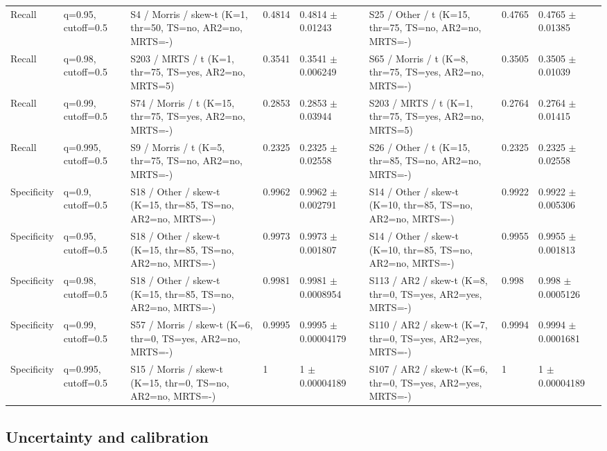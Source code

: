 \documentclass[11pt]{article}
\begin{document}
\begin{landscape}
\begin{longtable}{@{}P{1.6cm}P{1.8cm}P{5.2cm}P{1.3cm}P{2.1cm}P{5.2cm}P{1.3cm}P{2.1cm}@{}}
Recall & q=0.95, cutoff=0.5 & S4 / Morris / skew-t (K=1, thr=50, TS=no, AR2=no, MRTS=-) & 0.4814 & 0.4814 $\pm$ 0.01243 & S25 / Other / t (K=15, thr=75, TS=no, AR2=no, MRTS=-) & 0.4765 & 0.4765 $\pm$ 0.01385 \\
Recall & q=0.98, cutoff=0.5 & S203 / MRTS / t (K=1, thr=75, TS=yes, AR2=no, MRTS=5) & 0.3541 & 0.3541 $\pm$ 0.006249 & S65 / Morris / t (K=8, thr=75, TS=yes, AR2=no, MRTS=-) & 0.3505 & 0.3505 $\pm$ 0.01039 \\
Recall & q=0.99, cutoff=0.5 & S74 / Morris / t (K=15, thr=75, TS=yes, AR2=no, MRTS=-) & 0.2853 & 0.2853 $\pm$ 0.03944 & S203 / MRTS / t (K=1, thr=75, TS=yes, AR2=no, MRTS=5) & 0.2764 & 0.2764 $\pm$ 0.01415 \\
Recall & q=0.995, cutoff=0.5 & S9 / Morris / t (K=5, thr=75, TS=no, AR2=no, MRTS=-) & 0.2325 & 0.2325 $\pm$ 0.02558 & S26 / Other / t (K=15, thr=85, TS=no, AR2=no, MRTS=-) & 0.2325 & 0.2325 $\pm$ 0.02558 \\
Specificity & q=0.9, cutoff=0.5 & S18 / Other / skew-t (K=15, thr=85, TS=no, AR2=no, MRTS=-) & 0.9962 & 0.9962 $\pm$ 0.002791 & S14 / Other / skew-t (K=10, thr=85, TS=no, AR2=no, MRTS=-) & 0.9922 & 0.9922 $\pm$ 0.005306 \\
Specificity & q=0.95, cutoff=0.5 & S18 / Other / skew-t (K=15, thr=85, TS=no, AR2=no, MRTS=-) & 0.9973 & 0.9973 $\pm$ 0.001807 & S14 / Other / skew-t (K=10, thr=85, TS=no, AR2=no, MRTS=-) & 0.9955 & 0.9955 $\pm$ 0.001813 \\
Specificity & q=0.98, cutoff=0.5 & S18 / Other / skew-t (K=15, thr=85, TS=no, AR2=no, MRTS=-) & 0.9981 & 0.9981 $\pm$ 0.0008954 & S113 / AR2 / skew-t (K=8, thr=0, TS=yes, AR2=yes, MRTS=-) & 0.998 & 0.998 $\pm$ 0.0005126 \\
Specificity & q=0.99, cutoff=0.5 & S57 / Morris / skew-t (K=6, thr=0, TS=yes, AR2=no, MRTS=-) & 0.9995 & 0.9995 $\pm$ 0.00004179 & S110 / AR2 / skew-t (K=7, thr=0, TS=yes, AR2=yes, MRTS=-) & 0.9994 & 0.9994 $\pm$ 0.0001681 \\
Specificity & q=0.995, cutoff=0.5 & S15 / Morris / skew-t (K=15, thr=0, TS=no, AR2=no, MRTS=-) & 1 & 1 $\pm$ 0.00004189 & S107 / AR2 / skew-t (K=6, thr=0, TS=yes, AR2=yes, MRTS=-) & 1 & 1 $\pm$ 0.00004189 \\
\end{longtable}
\end{landscape}

\clearpage
\subsection{Uncertainty and calibration}
\end{document}
